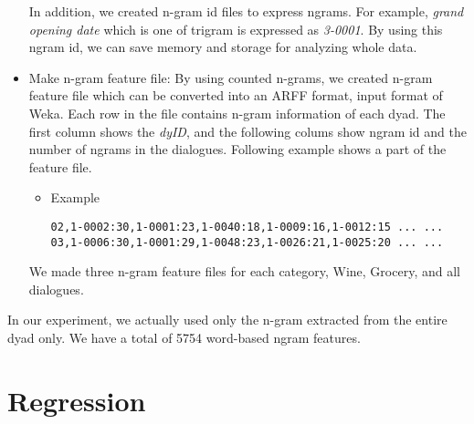 \documentclass[11pt]{article} %
\begin{document}
\begin{itemize}
In addition, we created n-gram id files to express ngrams. For example, \textit{grand opening date} which is one of trigram is expressed as \textit{3-0001}. By using this ngram id, we can save memory and storage for analyzing whole data.
\item Make n-gram feature file:\newline
By using counted n-grams, we created n-gram feature file which can be converted into an ARFF format, input format of Weka. Each row in the file contains n-gram information of each dyad. The first column shows the \textit{dyID}, and the following colums show ngram id and the number of ngrams in the dialogues. Following example shows a part of the feature file.
\begin{itemize}
\item Example
\begin{verbatim}
02,1-0002:30,1-0001:23,1-0040:18,1-0009:16,1-0012:15 ... ...
03,1-0006:30,1-0001:29,1-0048:23,1-0026:21,1-0025:20 ... ...
\end{verbatim}
\end{itemize}
We made three n-gram feature files for each category, Wine, Grocery, and all dialogues.
\end{itemize}

In our experiment, we actually used only the n-gram extracted from the entire dyad only. We have a total of 5754 word-based ngram features.

\section{Regression}
\end{document}
